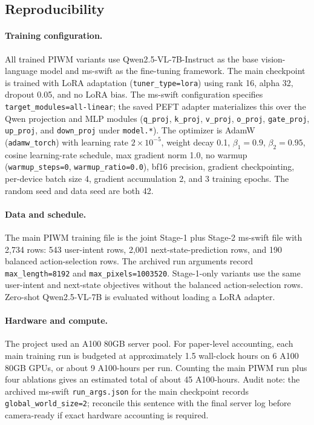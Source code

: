 \subsection{Reproducibility}
\label{sec:reproducibility}

\paragraph{Training configuration.}
All trained PIWM variants use Qwen2.5-VL-7B-Instruct as the base vision-language model and ms-swift as the fine-tuning framework. The main checkpoint is trained with LoRA adaptation (\texttt{tuner\_type=lora}) using rank 16, alpha 32, dropout 0.05, and no LoRA bias. The ms-swift configuration specifies \texttt{target\_modules=all-linear}; the saved PEFT adapter materializes this over the Qwen projection and MLP modules (\texttt{q\_proj}, \texttt{k\_proj}, \texttt{v\_proj}, \texttt{o\_proj}, \texttt{gate\_proj}, \texttt{up\_proj}, and \texttt{down\_proj} under \texttt{model.*}). The optimizer is AdamW (\texttt{adamw\_torch}) with learning rate $2\times10^{-5}$, weight decay 0.1, $\beta_1=0.9$, $\beta_2=0.95$, cosine learning-rate schedule, max gradient norm 1.0, no warmup (\texttt{warmup\_steps=0}, \texttt{warmup\_ratio=0.0}), bf16 precision, gradient checkpointing, per-device batch size 4, gradient accumulation 2, and 3 training epochs. The random seed and data seed are both 42.

\paragraph{Data and schedule.}
The main PIWM training file is the joint Stage-1 plus Stage-2 ms-swift file with 2,734 rows: 543 user-intent rows, 2,001 next-state-prediction rows, and 190 balanced action-selection rows. The archived run arguments record \texttt{max\_length=8192} and \texttt{max\_pixels=1003520}. Stage-1-only variants use the same user-intent and next-state objectives without the balanced action-selection rows. Zero-shot Qwen2.5-VL-7B is evaluated without loading a LoRA adapter.

\paragraph{Hardware and compute.}
The project used an A100 80GB server pool. For paper-level accounting, each main training run is budgeted at approximately 1.5 wall-clock hours on 6 A100 80GB GPUs, or about 9 A100-hours per run. Counting the main PIWM run plus four ablations gives an estimated total of about 45 A100-hours. Audit note: the archived ms-swift \texttt{run\_args.json} for the main checkpoint records \texttt{global\_world\_size=2}; reconcile this sentence with the final server log before camera-ready if exact hardware accounting is required.

